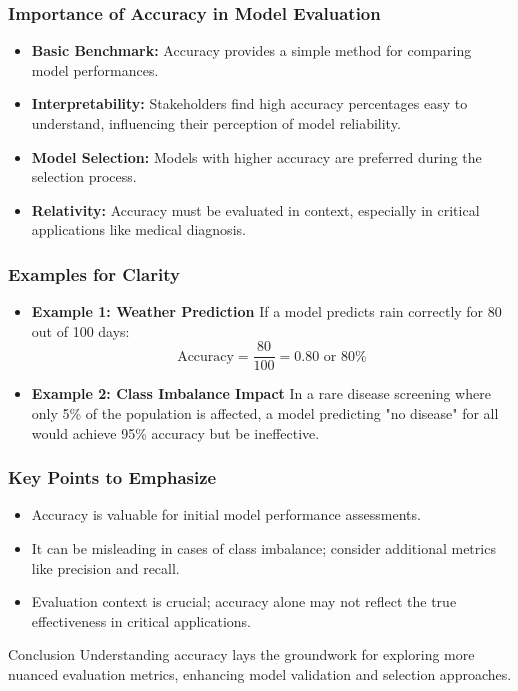 \documentclass[aspectratio=169]{beamer}
\begin{document}
\begin{frame}[fragile]
    \frametitle{Importance of Accuracy in Model Evaluation}
    \begin{itemize}
        \item \textbf{Basic Benchmark:} 
              Accuracy provides a simple method for comparing model performances.
        \item \textbf{Interpretability:} 
              Stakeholders find high accuracy percentages easy to understand, influencing their perception of model reliability.
        \item \textbf{Model Selection:} 
              Models with higher accuracy are preferred during the selection process.
        \item \textbf{Relativity:} 
              Accuracy must be evaluated in context, especially in critical applications like medical diagnosis. 
    \end{itemize}
\end{frame}

\begin{frame}[fragile]
    \frametitle{Examples for Clarity}
    \begin{itemize}
        \item \textbf{Example 1: Weather Prediction}
              If a model predicts rain correctly for 80 out of 100 days:
              \begin{equation}
              \text{Accuracy} = \frac{80}{100} = 0.80 \text{ or } 80\%
              \end{equation}
              
        \item \textbf{Example 2: Class Imbalance Impact}
              In a rare disease screening where only 5\% of the population is affected, a model predicting "no disease" for all would achieve 95\% accuracy but be ineffective.
    \end{itemize}
\end{frame}

\begin{frame}[fragile]
    \frametitle{Key Points to Emphasize}
    \begin{itemize}
        \item Accuracy is valuable for initial model performance assessments.
        \item It can be misleading in cases of class imbalance; consider additional metrics like precision and recall.
        \item Evaluation context is crucial; accuracy alone may not reflect the true effectiveness in critical applications.
    \end{itemize}
    \begin{block}{Conclusion}
        Understanding accuracy lays the groundwork for exploring more nuanced evaluation metrics, enhancing model validation and selection approaches.
    \end{block}
\end{frame}
\end{document}
